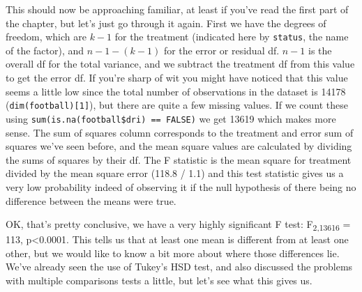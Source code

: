 \documentclass[
]{book}
\newenvironment{Shaded}{\begin{snugshade}}{\end{snugshade}}
\newcommand{\DataTypeTok}[1]{\textcolor[rgb]{0.13,0.29,0.53}{#1}}
\newcommand{\DecValTok}[1]{\textcolor[rgb]{0.00,0.00,0.81}{#1}}
\newcommand{\FloatTok}[1]{\textcolor[rgb]{0.00,0.00,0.81}{#1}}
\newcommand{\KeywordTok}[1]{\textcolor[rgb]{0.13,0.29,0.53}{\textbf{#1}}}
\newcommand{\NormalTok}[1]{#1}
\newcommand{\OperatorTok}[1]{\textcolor[rgb]{0.81,0.36,0.00}{\textbf{#1}}}
\newcommand{\StringTok}[1]{\textcolor[rgb]{0.31,0.60,0.02}{#1}}
\begin{document}
This should now be approaching familiar, at least if you've read the first part of the chapter, but let's just go through it again. First we have the degrees of freedom, which are \(k-1\) for the treatment (indicated here by \texttt{status}, the name of the factor), and \(n-1 - (k-1)\) for the error or residual df. \(n-1\) is the overall df for the total variance, and we subtract the treatment df from this value to get the error df. If you're sharp of wit you might have noticed that this value seems a little low since the total number of observations in the dataset is 14178 (\texttt{dim(football){[}1{]}}), but there are quite a few missing values. If we count these using \texttt{sum(is.na(football\$dri)\ ==\ FALSE)} we get 13619 which makes more sense. The sum of squares column corresponds to the treatment and error sum of squares we've seen before, and the mean square values are calculated by dividing the sums of squares by their df. The F statistic is the mean square for treatment divided by the mean square error (118.8 / 1.1) and this test statistic gives us a very low probability indeed of observing it if the null hypothesis of there being no difference between the means were true.

OK, that's pretty conclusive, we have a very highly significant F test: F\textsubscript{2,13616} = 113, p\textless0.0001. This tells us that at least one mean is different from at least one other, but we would like to know a bit more about where those differences lie. We've already seen the use of Tukey's HSD test, and also discussed the problems with multiple comparisons tests a little, but let's see what this gives us.

\begin{Shaded}
\end{Shaded}
\end{document}
